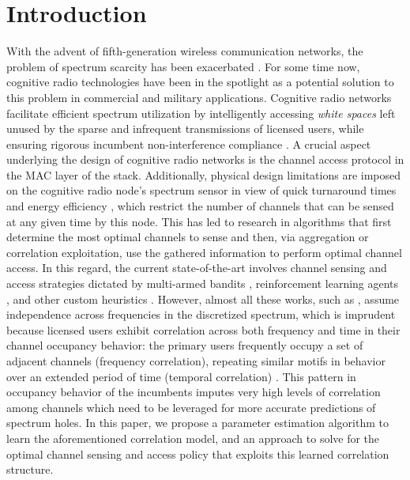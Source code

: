 \documentclass[10pt,twocolumn]{IEEEtran}
\begin{document}
\section{Introduction}\label{I}
With the advent of fifth-generation wireless communication networks, the problem of spectrum scarcity has been exacerbated \cite{7158089}. For some time now, cognitive radio technologies have been in the spotlight as a potential solution to this problem in commercial and military applications. Cognitive radio networks facilitate efficient spectrum utilization by intelligently accessing \emph{white spaces} left unused by the sparse and infrequent transmissions of licensed users, while ensuring rigorous incumbent non-interference compliance \cite{4562537}. A crucial aspect underlying the design of cognitive radio networks is the channel access protocol in the MAC layer of the stack. Additionally, physical design limitations are imposed on the cognitive radio node's spectrum sensor in view of quick turnaround times and energy efficiency \cite{5990482}, which restrict the number of channels that can be sensed at any given time by this node. This has led to research in algorithms that first determine the most optimal channels to sense and then, via aggregation or correlation exploitation, use the gathered information to perform optimal channel access. In this regard, the current state-of-the-art involves channel sensing and access strategies dictated by multi-armed bandits \cite{7094730}, reinforcement learning agents \cite{6507570}, and other custom heuristics \cite{4554696, 6956794}. However, almost all these works, such as \cite{7094730, 6507570}, assume independence across frequencies in the discretized spectrum, which is imprudent because licensed users exhibit correlation across both frequency and time in their channel occupancy behavior: the primary users frequently occupy a set of adjacent channels (frequency correlation), repeating similar motifs in behavior over an extended period of time (temporal correlation) \cite{6188346, 4213046,McHenry:2006:CSO:1234388.1234389}. This pattern in occupancy behavior of the incumbents imputes very high levels of correlation among channels which need to be leveraged for more accurate predictions of spectrum holes. In this paper, we propose a parameter estimation algorithm to learn the aforementioned correlation model, and an approach to solve for the optimal channel sensing and access policy that exploits this learned correlation structure.
\end{document}
